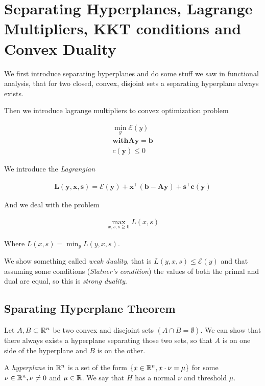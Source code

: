 
\section{Separating Hyperplanes, Lagrange Multipliers, KKT conditions and Convex Duality}

We first introduce separating hyperplanes and do some stuff we saw in functional analysis, that for two closed, convex, disjoint sets a separating hyperplane always exists.

Then we introduce lagrange multipliers to convex optimization problem

\begin{align*}
    \min _y \mathcal{E}(y) \\
    \textbf{with} \mathbf{Ay = b} \\
    c(\mathbf{y}) \leq 0
\end{align*}

We introduce the \textit{Lagrangian}

\begin{align*}
    \mathbf{L(y,x,s) = \mathcal{E}(y) + x^\top (b-Ay) + s^\top c(y)}
\end{align*}

And we deal with the problem

\begin{align*}
    \max_{x,s, s\geq0} L(x,s)
\end{align*}

Where $L(x,s) = \min_y L(y,x,s)$.

We show something called \textit{weak duality}, that is $L(y,x,s) \leq \mathcal{E} (y)$ and that assuming some conditions (\textit{Slatner's condition}) the values of both the primal and dual are equal, so this is \textit{strong duality}.

\subsection{Sparating Hyperplane Theorem}

Let $A, B \subset \mathbb{R} ^n$ be two convex and discjoint sets $(A \cap B = \emptyset)$. We can show that there always exists a hyperplane separating those two sets, so that $A$ is on one side of the hyperplane and $B$ is on the other.

\begin{definicija}
    A \textit{hyperplane} in $\mathbb{R}^n$ is a set of the form $\{ x \in \mathbb{R} ^n, x \cdot \nu = \mu \}$ for some $\nu \in \mathbb{R}^n, \nu \neq 0$ and $\mu \in \mathbb{R}$. We say that $H$ has a normal $\nu$ and threshold $\mu$.
\end{definicija}

